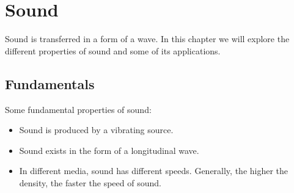 \documentclass[../main.tex]{subfiles}
\begin{document}
	\section{Sound}
	\begin{preamb}
		Sound is transferred in a form of a wave. In this chapter we will explore the different properties of sound and some of its applications.
	\end{preamb}	
	\subsection{Fundamentals}
	Some fundamental properties of sound:
	\begin{itemize}
		\item Sound is produced by a vibrating source.
		\item Sound exists in the form of a longitudinal wave.
		\item In different media, sound has different speeds. Generally, the higher the density, the faster the speed of sound.
	\end{itemize}
	\begin{center}
	\end{center}
\end{document}
